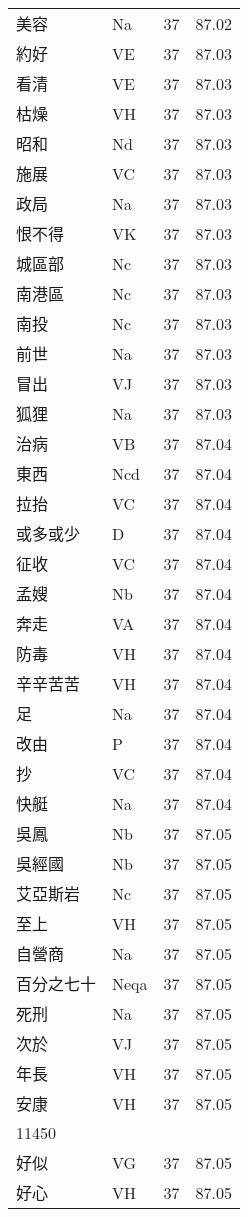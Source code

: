 \documentclass[twocolumn]{book}
\begin{document}
\begin{supertabular}{llrr}
美容 & Na & 37 &  87.02\\
約好 & VE & 37 &  87.03\\
看清 & VE & 37 &  87.03\\
枯燥 & VH & 37 &  87.03\\
昭和 & Nd & 37 &  87.03\\
施展 & VC & 37 &  87.03\\
政局 & Na & 37 &  87.03\\
恨不得 & VK & 37 &  87.03\\
城區部 & Nc & 37 &  87.03\\
南港區 & Nc & 37 &  87.03\\
南投 & Nc & 37 &  87.03\\
前世 & Na & 37 &  87.03\\
冒出 & VJ & 37 &  87.03\\
狐狸 & Na & 37 &  87.03\\
治病 & VB & 37 &  87.04\\
東西 & Ncd & 37 &  87.04\\
拉抬 & VC & 37 &  87.04\\
或多或少 & D & 37 &  87.04\\
征收 & VC & 37 &  87.04\\
孟嫂 & Nb & 37 &  87.04\\
奔走 & VA & 37 &  87.04\\
防毒 & VH & 37 &  87.04\\
辛辛苦苦 & VH & 37 &  87.04\\
足 & Na & 37 &  87.04\\
改由 & P & 37 &  87.04\\
抄 & VC & 37 &  87.04\\
快艇 & Na & 37 &  87.04\\
吳鳳 & Nb & 37 &  87.05\\
吳經國 & Nb & 37 &  87.05\\
艾亞斯岩 & Nc & 37 &  87.05\\
至上 & VH & 37 &  87.05\\
自營商 & Na & 37 &  87.05\\
百分之七十 & Neqa & 37 &  87.05\\
死刑 & Na & 37 &  87.05\\
次於 & VJ & 37 &  87.05\\
年長 & VH & 37 &  87.05\\
安康 & VH & 37 &  87.05\\
11450\\
好似 & VG & 37 &  87.05\\
好心 & VH & 37 &  87.05\\

\end{supertabular}
\end{document}
